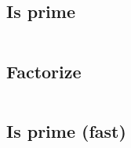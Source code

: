\subsection{Is prime}
\inputminted[frame=single,framesep=3pt,tabsize=2,breaklines=true,linenos,label=O(sqrt(N))]{c++}{math/is-prime.cpp}

\subsection{Factorize}
\inputminted[frame=single,framesep=3pt,tabsize=2,breaklines=true,linenos,label=O(N log(log(N)))]{c++}{math/factorize.cpp}

\subsection{Is prime (fast)}
\inputminted[frame=single,framesep=3pt,tabsize=2,breaklines=true,linenos,label=O(polylog(N))]{c++}{math/is-prime-fast.cpp}